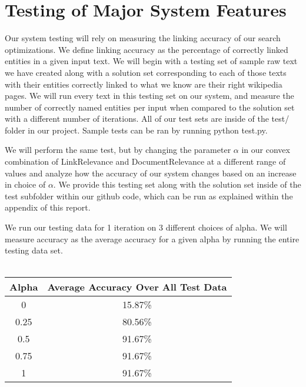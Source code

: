 \documentclass[twoside,11pt]{article}
\begin{document}
\section{Testing of Major System Features}

Our system testing will rely on measuring the linking accuracy of our search optimizations. We define linking accuracy as the percentage of correctly linked entities in a given input text. We will begin with a testing set of sample raw text we have created along with a solution set corresponding to each of those texts with their entities correctly linked to what we know are their right wikipedia pages. We will run every text in this testing set on our system, and measure the number of correctly named entities per input when compared to the solution set with a different number of iterations. All of our test sets are inside of the test/ folder in our project. Sample tests can be ran by running python test.py.

We will perform the same test, but by changing the parameter $\alpha$ in our convex combination of LinkRelevance and DocumentRelevance at a different range of values and analyze how the accuracy of our system changes based on an increase in choice of $\alpha$. We provide this testing set along with the solution set inside of the test subfolder within our github code, which can be run as explained within the appendix of this report.

We run our testing data for 1 iteration on 3 different choices of alpha. We will measure accuracy as the average accuracy for a given alpha by running the entire testing data set.
\\ \\
\begin{tabular}{cc}
\hline
\textbf{Alpha}            & \textbf{Average Accuracy Over All Test Data} \\ \hline
\multicolumn{1}{|c|}{0}   & \multicolumn{1}{c|}{15.87\%}                    \\ \hline
\multicolumn{1}{|c|}{0.25} & \multicolumn{1}{c|}{80.56\%}                    \\ \hline
\multicolumn{1}{|c|}{0.5} & \multicolumn{1}{c|}{91.67\%}                    \\ \hline
\multicolumn{1}{|c|}{0.75} & \multicolumn{1}{c|}{91.67\%}                    \\ \hline
\multicolumn{1}{|c|}{1}   & \multicolumn{1}{c|}{91.67\%}                    \\ \hline
\end{tabular}
\end{document}

